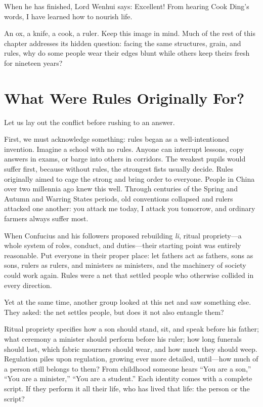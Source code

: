 When he has finished, Lord Wenhui says: Excellent! From hearing Cook Ding's words, I have learned how to nourish life.

An ox, a knife, a cook, a ruler. Keep this image in mind. Much of the rest of this chapter addresses its hidden question: facing the same structures, grain, and rules, why do some people wear their edges blunt while others keep theirs fresh for nineteen years?

\section{What Were Rules Originally For?}
Let us lay out the conflict before rushing to an answer.

First, we must acknowledge something: rules began as a well-intentioned invention. Imagine a school with no rules. Anyone can interrupt lessons, copy answers in exams, or barge into others in corridors. The weakest pupils would suffer first, because without rules, the strongest fists usually decide. Rules originally aimed to cage the strong and bring order to everyone. People in China over two millennia ago knew this well. Through centuries of the Spring and Autumn and Warring States periods, old conventions collapsed and rulers attacked one another: you attack me today, I attack you tomorrow, and ordinary farmers always suffer most.

When Confucius and his followers proposed rebuilding \textit{li}, ritual propriety---a whole system of roles, conduct, and duties---their starting point was entirely reasonable. Put everyone in their proper place: let fathers act as fathers, sons as sons, rulers as rulers, and ministers as ministers, and the machinery of society could work again. Rules were a net that settled people who otherwise collided in every direction.

Yet at the same time, another group looked at this net and saw something else. They asked: the net settles people, but does it not also entangle them?

Ritual propriety specifies how a son should stand, sit, and speak before his father; what ceremony a minister should perform before his ruler; how long funerals should last, which fabric mourners should wear, and how much they should weep. Regulation piles upon regulation, growing ever more detailed, until---how much of a person still belongs to them? From childhood someone hears ``You are a son,'' ``You are a minister,'' ``You are a student.'' Each identity comes with a complete script. If they perform it all their life, who has lived that life: the person or the script?

